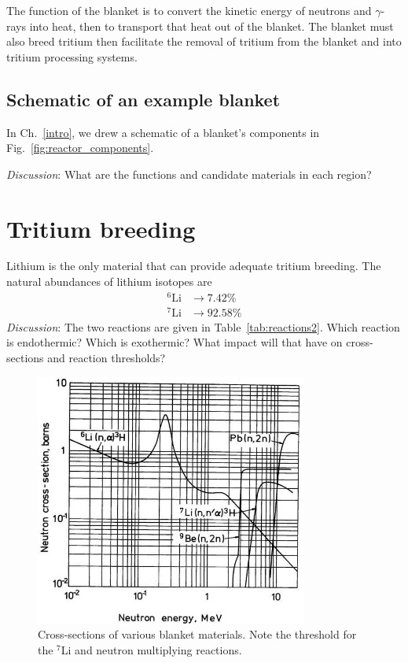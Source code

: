 \documentclass[11pt]{report} %
\begin{document}
The function of the blanket is to convert the kinetic energy of neutrons and $\gamma$-rays into heat, then to transport that heat out of the blanket. The blanket must also breed tritium then facilitate the removal of tritium from the blanket and into tritium processing systems.

\subsection{Schematic of an example blanket}
In Ch.~\ref{intro}, we drew a schematic of a blanket's components in Fig.~\ref{fig:reactor_components}. 

{\it Discussion}: What are the functions and candidate materials in each region?





\section{Tritium breeding}
Lithium is the only material that can provide adequate tritium breeding. The natural abundances of lithium isotopes are
\begin{align*}
^6\mathrm{Li} &\rightarrow 7.42\% \\
^7\mathrm{Li} &\rightarrow 92.58\%
\end{align*}
{\it Discussion}: The two reactions are given in Table~\ref{tab:reactions2}. Which reaction is endothermic? Which is exothermic? What impact will that have on cross-sections and reaction thresholds?


\begin{figure}
\centering
\includegraphics[width=0.8\textwidth]{../images/breeding_xsecs} 
\caption{Cross-sections of various blanket materials. Note the threshold for the $^7$Li and neutron multiplying reactions.}
\label{fig:xsects}
\end{figure}
\end{document}
